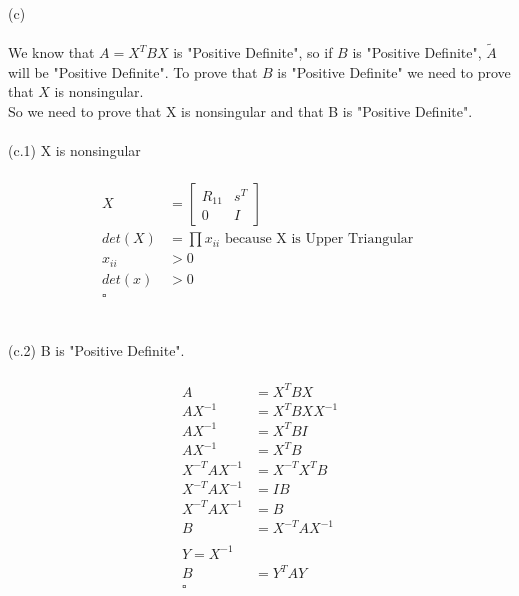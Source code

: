 \documentclass{article}
\begin{document}
	\\
	(c)\\
	\\
	We know that $A = X^TBX$ is "Positive Definite", so if $B$ is "Positive Definite", $\tilde{A}$ will be "Positive Definite". To prove that $B$ is "Positive Definite" we need to prove that $X$ is nonsingular.\\
	So we need to prove that X is nonsingular and that B is "Positive Definite".\\
	\\
	(c.1) X is nonsingular\\
	\\
	\begin{align*}
		X &= \begin{bmatrix}R_{11}&s^T\\0&I\end{bmatrix}\\
		det(X) &= \prod{x_{ii}} \text { because X is Upper Triangular }\\
		x_{ii} &> 0\\
		det(x) &> 0\\
		\square
	\end{align*}\\
	\\
	(c.2) B is "Positive Definite".\\
	\\
	\begin{align*}
		A &= X^TBX\\
		AX^{-1} &= X^TBXX^{-1}\\
		AX^{-1} &= X^TBI\\		
		AX^{-1} &= X^TB\\				
		X^{-T}AX^{-1} &= X^{-T}X^TB\\						
		X^{-T}AX^{-1} &= IB\\		
		X^{-T}AX^{-1} &= B\\				
		B &= X^{-T}AX^{-1}\\
		\\
		Y = X^{-1}
		\\
		B &= Y^TAY\\
		\square
	\end{align*}
\end{document}
